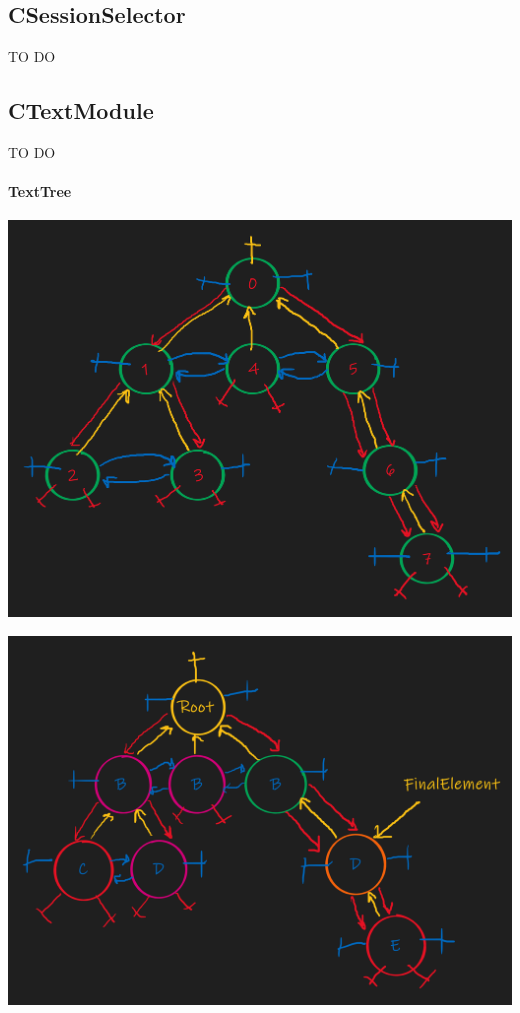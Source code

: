 \documentclass{article}
\begin{document}
\subsection{CSessionSelector}

TO DO

\subsection{CTextModule}

TO DO

\paragraph{TextTree}
\begin{center}
\includegraphics[scale = 0.2]{Figures/VTree.png}
\end{center}

\begin{center}
\includegraphics[scale = 0.4]{Figures/TreePrimitives3a.png}
\end{center}
\end{document}
